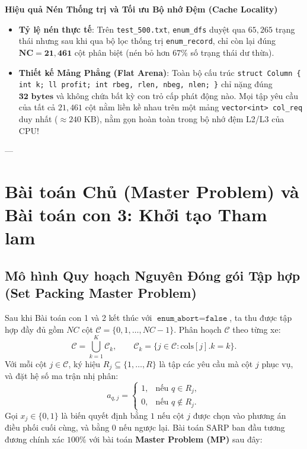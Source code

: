 \documentclass[11pt,a4paper]{article}
\theoremstyle{definition}
\newenvironment{keybox}[1]{%
    \par\medskip\noindent
    \begin{lrbox}{\calloutbox}%
    \begin{minipage}{\dimexpr\linewidth-2\fboxsep-2\fboxrule\relax}
    \textbf{\textcolor{primaryblue}{#1}}\par\smallskip
}{%
    \end{minipage}%
    \end{lrbox}%
    \fcolorbox{primaryblue}{secondaryblue}{\usebox{\calloutbox}}%
    \par\medskip
}
\begin{document}
\begin{keybox}{Hiệu quả Nén Thống trị và Tối ưu Bộ nhớ Đệm (Cache Locality)}
\begin{itemize}[leftmargin=1.2em]
    \item \textbf{Tỷ lệ nén thực tế}: Trên \texttt{test\_500.txt}, \texttt{enum\_dfs} duyệt qua $65,265$ trạng thái nhưng sau khi qua bộ lọc thống trị \texttt{enum\_record}, chỉ còn lại đúng $\mathbf{NC = 21,461}$ cột phân biệt (nén bỏ hơn $67\%$ số trạng thái dư thừa).
    \item \textbf{Thiết kế Mảng Phẳng (Flat Arena)}: Toàn bộ cấu trúc \texttt{struct Column \{ int k; ll profit; int rbeg, rlen, nbeg, nlen; \}} chỉ nặng đúng $\mathbf{32\text{ bytes}}$ và không chứa bất kỳ con trỏ cấp phát động nào. Mọi tập yêu cầu của tất cả $21,461$ cột nằm liền kề nhau trên một mảng \texttt{vector<int> col\_req} duy nhất ($\approx 240\text{ KB}$), nằm gọn hoàn toàn trong bộ nhớ đệm L2/L3 của CPU!
\end{itemize}
\end{keybox}

---

\section{Bài toán Chủ (Master Problem) và Bài toán con 3: Khởi tạo Tham lam}

\subsection{Mô hình Quy hoạch Nguyên Đóng gói Tập hợp (Set Packing Master Problem)}
Sau khi Bài toán con 1 và 2 kết thúc với $\texttt{enum\_abort} = \texttt{false}$, ta thu được tập hợp đầy đủ gồm $NC$ cột $\mathcal{C} = \{0, 1, \dots, NC-1\}$. Phân hoạch $\mathcal{C}$ theo từng xe:
\[
    \mathcal{C} = \bigcup_{k=1}^K \mathcal{C}_k, \qquad \mathcal{C}_k = \{j \in \mathcal{C} : \text{cols}[j].k = k\}.
\]
Với mỗi cột $j \in \mathcal{C}$, ký hiệu $R_j \subseteq \{1, \dots, R\}$ là tập các yêu cầu mà cột $j$ phục vụ, và đặt hệ số ma trận nhị phân:
\[
    a_{q, j} = \begin{cases}
    1, & \text{nếu } q \in R_j,\\
    0, & \text{nếu } q \notin R_j.
    \end{cases}
\]
Gọi $x_j \in \{0, 1\}$ là biến quyết định bằng $1$ nếu cột $j$ được chọn vào phương án điều phối cuối cùng, và bằng $0$ nếu ngược lại. Bài toán SARP ban đầu tương đương chính xác $100\%$ với bài toán \textbf{Master Problem (MP)} sau đây:
\end{document}
